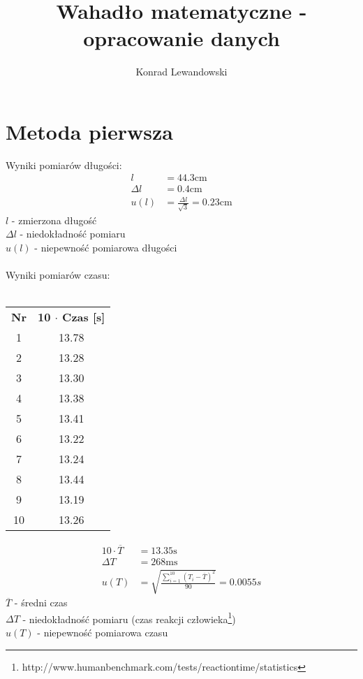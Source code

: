 \documentclass[12pt]{article}
\title{\textbf{Wahadło matematyczne - opracowanie danych}}
\author{Konrad Lewandowski}
\date{}
\begin{document}
\maketitle

\section{Metoda pierwsza}
\begin{multicols}{2}
Wyniki pomiarów długości:
\begin{align}
l &= 44.3 \si{\cm} \\
\Delta l &= 0.4 \si{\cm} \\
u(l) &= \frac{\Delta l}{\sqrt{3}} = 0.23 \si{\cm}
\end{align}
$l$ - zmierzona długość \\
$\Delta l$ - niedokładność pomiaru \\
$u(l)$ - niepewność pomiarowa długości
\\\\
Wyniki pomiarów czasu:
\\\\
\begin{center}
\begin{tabular}{|c|c|}
\hline
\textbf{Nr} & \textbf{10 $\cdot$ Czas [s]} \\
1 & 13.78  \\ \hline
2 & 13.28  \\ \hline
3 & 13.30  \\ \hline
4 & 13.38  \\ \hline
5 & 13.41 \\ \hline 
6 & 13.22 \\ \hline 
7 & 13.24 \\ \hline 
8 & 13.44 \\ \hline 
9 & 13.19 \\ \hline 
10 & 13.26 \\ \hline
\end{tabular}
\end{center}

\begin{align}
10\cdot\overline{T} & = 13.35 \si{\s} \\
\Delta T &= 268\si{\ms} \\
u(T) &= \sqrt{\frac{\sum\limits_{i=1}^{10}{(T_i - \overline{T})^2}}{90}} = 0.0055 \si{s}
\end{align}
$\overline{T}$ - średni czas \\
$\Delta T$ - niedokładność pomiaru (czas reakcji człowieka\footnote{http://www.humanbenchmark.com/tests/reactiontime/statistics}) \\
$u(T)$ - niepewność pomiarowa czasu


\end{multicols}
\end{document}
